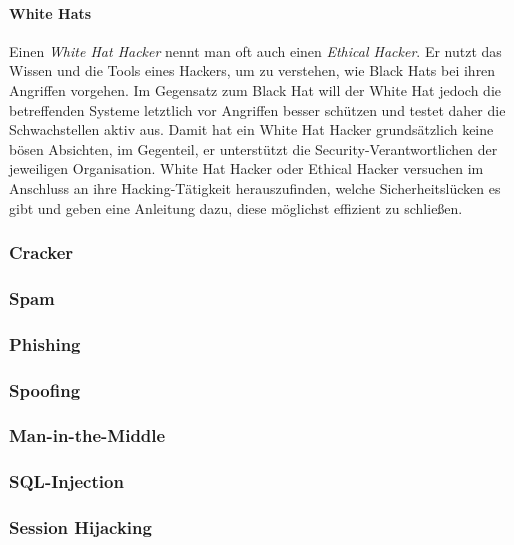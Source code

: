 \paragraph{White Hats} Einen \textit{White Hat Hacker} nennt man oft auch einen \textit{Ethical Hacker}. Er nutzt das Wissen und die Tools eines Hackers, um zu verstehen, wie Black Hats bei ihren Angriffen vorgehen. Im Gegensatz zum Black Hat will der White Hat jedoch die betreffenden Systeme letztlich vor Angriffen besser schützen und testet daher die Schwachstellen aktiv aus. Damit hat ein White Hat Hacker grundsätzlich keine bösen Absichten, im Gegenteil, er unterstützt die Security-Verantwortlichen der jeweiligen Organisation. White Hat Hacker oder Ethical Hacker versuchen im Anschluss an ihre Hacking-Tätigkeit herauszufinden, welche Sicherheitslücken es gibt und geben eine Anleitung dazu, diese möglichst effizient zu schließen.

\subsubsection{Cracker}
\label{sec:Cracker}

\subsubsection{Spam}
\label{sec:Spam}

\subsubsection{Phishing}
\label{sec:Phishing}

\subsubsection{Spoofing}
\label{sec:Spoofing}

\subsubsection{Man-in-the-Middle}
\label{sec:ManInTheMiddle}

\subsubsection{SQL-Injection}

\subsubsection{Session Hijacking}
\label{sec:SessionHijacking}

